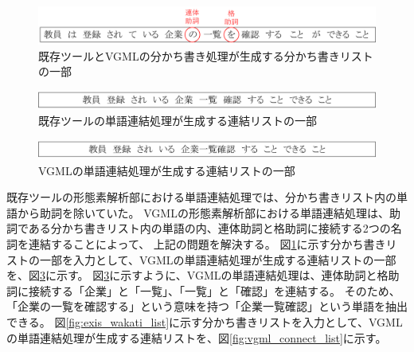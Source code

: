 \begin{figure}[t]
    \begin{center}
        \includegraphics[width=1.0\columnwidth]{image/exis_wakati.png}
        \caption{既存ツールとVGMLの分かち書き処理が生成する分かち書きリストの一部}
        \label{fig:exis_wakati}
    \end{center}
\end{figure}

\begin{figure}[t]
    \begin{center}
        \includegraphics[width=1.0\columnwidth]{image/exis_connect.png}
        \caption{既存ツールの単語連結処理が生成する連結リストの一部}
        \label{fig:exis_connect}
    \end{center}
\end{figure}

\begin{figure}[t]
    \begin{center}
        \includegraphics[width=1.0\columnwidth]{image/vgml_connect.png}
        \caption{VGMLの単語連結処理が生成する連結リストの一部}
        \label{fig:vgml_connect}
    \end{center}
\end{figure}

既存ツールの形態素解析部における単語連結処理では、分かち書きリスト内の単語から助詞を除いていた。
VGMLの形態素解析部における単語連結処理は、助詞である分かち書きリスト内の単語の内、連体助詞と格助詞に接続する2つの名詞を連結することによって、
上記の問題を解決する。
図\ref{fig:exis_wakati}に示す分かち書きリストの一部を入力として、VGMLの単語連結処理が生成する連結リストの一部を、図\ref{fig:vgml_connect}に示す。
図\ref{fig:vgml_connect}に示すように、VGMLの単語連結処理は、連体助詞と格助詞に接続する「企業」と「一覧」、「一覧」と「確認」を連結する。
そのため、「企業の一覧を確認する」という意味を持つ「企業一覧確認」という単語を抽出できる。
図\ref{fig:exis_wakati_list}に示す分かち書きリストを入力として、VGMLの単語連結処理が生成する連結リストを、図\ref{fig:vgml_connect_list}に示す。

